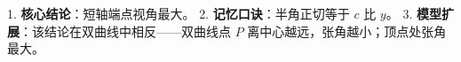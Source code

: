 \begin{summarybox}
1. \textbf{核心结论}：短轴端点视角最大。
2. \textbf{记忆口诀}：半角正切等于 $c$ 比 $y$。
3. \textbf{模型扩展}：该结论在双曲线中相反——双曲线点 $P$ 离中心越远，张角越小；顶点处张角最大。
\end{summarybox}